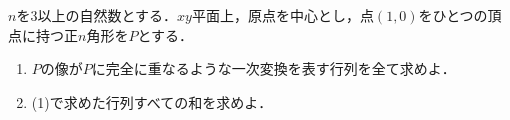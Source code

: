 \documentclass[../../main.tex]{subfiles}
\begin{document}
$n$を$3$以上の自然数とする．$xy$平面上，原点を中心とし，点$(1,0)$をひとつの頂点に持つ正$n$角形を$P$とする．
\begin{enumerate}
  \item $P$の像が$P$に完全に重なるような一次変換を表す行列を全て求めよ．
  \item (1)で求めた行列すべての和を求めよ．
\end{enumerate}
\end{document}
